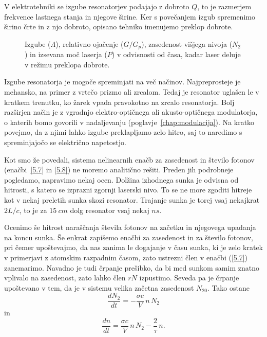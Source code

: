 \begin{remark}
V elektrotehniki se izgube resonatorjev podajajo z dobroto $Q$, to je razmerjem
frekvence lastnega stanja in njegove širine. Ker s povečanjem izgub spremenimo 
širino črte in z njo dobroto, opisano tehniko imenujemo preklop 
dobrote.
\end{remark}

\begin{figure}[h]
\centering
\def\svgwidth{90truemm} 

\caption{Izgube ($\Lambda$), relativno ojačenje ($G/G_p$), zasedenost višjega 
nivoja ($N_2$) in izsevana moč laserja ($P$) v odvisnosti od časa, kadar laser 
deluje v režimu preklopa dobrote.}
\label{fig:pulseQ}
\end{figure}

Izgube resonatorja je mogoče spreminjati na več načinov. Najpreprosteje
je mehansko, na primer z vrtečo prizmo ali zrcalom. Tedaj je resonator uglašen le v kratkem
trenutku, ko žarek vpada pravokotno na zrcalo resonatorja. Bolj razširjen način 
je z vgradnjo elektro-optičnega ali akusto-optičnega modulatorja, o katerih
bomo govorili v nadaljevanju (poglavje~\ref{chap:modulacija}). Na kratko povejmo, 
da z njimi lahko izgube preklapljamo zelo hitro, saj to naredimo s spreminjajočo se 
električno napetostjo.

Kot smo že povedali, sistema nelinearnih enačb za zasedenost in število fotonov
(enačbi~\ref{5.7} in \ref{5.8}) ne moremo analitično rešiti. Preden jih podrobneje
pogledamo, napravimo nekaj ocen. Dolžina izhodnega sunka je odvisna od hitrosti, 
s katero se izprazni zgornji laserski nivo. To se ne more zgoditi
hitreje kot v nekaj preletih sunka skozi resonator. Trajanje sunka je torej
vsaj nekajkrat $2L/c$, to je za $15~\si{cm}$ dolg resonator vsaj nekaj $\si{ns}$.

Ocenimo še hitrost naraščanja števila fotonov na začetku in 
njegovega upadanja na koncu sunka. Še enkrat zapišemo enačbi za zasedenost in za število
fotonov, pri čemer upoštevajmo, da nas zanima le dogajanje v času sunka,
ki je zelo kratek v primerjavi z atomskim razpadnim časom, zato 
ustrezni člen v enačbi (\ref{5.7}) zanemarimo. Navadno je tudi črpanje prešibko, da
bi med sunkom samim znatno vplivalo na zasedenost, zato lahko člen $rN$
izpustimo. Seveda pa je črpanje upoštevano v tem, da je v sistemu velika začetna 
zasedenost $N_{20}$. Tako ostane 
\begin{equation}
 \frac{d N_2}{d t}=-\frac{\sigma c}{V}\,n\,N_2 
 \label{5.32a}
\end{equation}
in 
\begin{equation}
 \frac{d n}{d t}=\frac{\sigma c}{V}\,n\,N_2 - \frac{2}{\tau}\,n.
 \label{5.32}
\end{equation}

